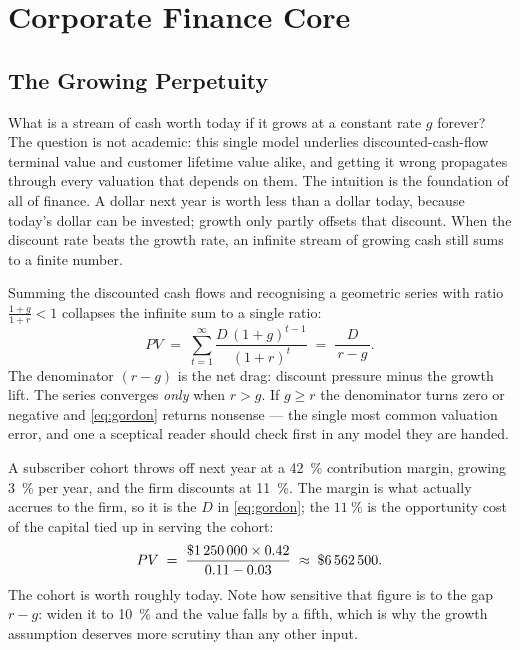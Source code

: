\chapter{Corporate Finance Core}\label{ch:corporate-finance-core}


\section{The Growing Perpetuity}\label{sec:growing-perpetuity}

What is a stream of cash worth today if it grows at a constant rate \(g\) forever? The
question is not academic: this single model underlies discounted-cash-flow terminal value
and customer lifetime value alike, and getting it wrong propagates through every valuation
that depends on them. The intuition is the foundation of all of finance. A dollar next year
is worth less than a dollar today, because today's dollar can be invested; growth only
partly offsets that discount. When the discount rate beats the growth rate, an infinite
stream of growing cash still sums to a finite number.

Summing the discounted cash flows and recognising a geometric series with ratio
\(\frac{1+g}{1+r}<1\) collapses the infinite sum to a single ratio:
\begin{equation}\label{eq:gordon}
  PV \;=\; \sum_{t=1}^{\infty}\frac{D\,(1+g)^{t-1}}{(1+r)^{t}}
      \;=\; \frac{D}{\,r-g\,}.
\end{equation}
The denominator \((r-g)\) is the net drag: discount pressure minus the growth lift. The
series converges \emph{only} when \(r>g\). If \(g\ge r\) the denominator turns zero or
negative and \cref{eq:gordon} returns nonsense --- the single most common valuation error,
and one a sceptical reader should check first in any model they are handed.

\begin{example}
A subscriber cohort throws off  next year at a \qty{42}{\percent} contribution
margin, growing \qty{3}{\percent} per year, and the firm discounts at \qty{11}{\percent}. The
margin is what actually accrues to the firm, so it is the \(D\) in \cref{eq:gordon}; the
\(\qty{11}{\percent}\) is the opportunity cost of the capital tied up in serving the cohort:
\[
  PV \;=\; \frac{\$\num{1250000}\times 0.42}{0.11-0.03}\;\approx\;\$\num{6562500}.
\]
The cohort is worth roughly  today. Note how sensitive that figure is to the
gap \(r-g\): widen it to \qty{10}{\percent} and the value falls by a fifth, which is why the
growth assumption deserves more scrutiny than any other input.
\end{example}

